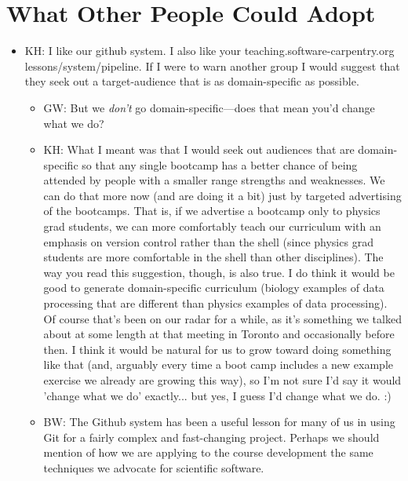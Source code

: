 \documentclass{article}
\begin{document}
\section{What Other People Could Adopt}

\begin{itemize}

  \item KH: I like our github system. I also like your
    teaching.software-carpentry.org lessons/system/pipeline. If I were
    to warn another group I would suggest that they seek out a
    target-audience that is as domain-specific as possible.

    \begin{itemize}

      \item GW: But we \emph{don't} go domain-specific---does that
        mean you'd change what we do?

      \item KH: What I meant was that I would seek out audiences that
        are domain-specific so that any single bootcamp has a better
        chance of being attended by people with a smaller range
        strengths and weaknesses. We can do that more now (and are
        doing it a bit) just by targeted advertising of the
        bootcamps. That is, if we advertise a bootcamp only to physics
        grad students, we can more comfortably teach our curriculum
        with an emphasis on version control rather than the shell
        (since physics grad students are more comfortable in the shell
        than other disciplines). The way you read this suggestion,
        though, is also true. I do think it would be good to generate
        domain-specific curriculum (biology examples of data
        processing that are different than physics examples of data
        processing). Of course that's been on our radar for a while,
        as it's something we talked about at some length at that
        meeting in Toronto and occasionally before then. I think it
        would be natural for us to grow toward doing something like
        that (and, arguably every time a boot camp includes a new
        example exercise we already are growing this way), so I'm not
        sure I'd say it would 'change what we do' exactly... but yes,
        I guess I'd change what we do. :)

      \item BW: The Github system has been a useful lesson for many of
	us in using Git for a fairly complex and fast-changing project.
	Perhaps we should mention of how we are applying to the course development
	the same techniques we advocate for scientific software.


\end{itemize}
\end{itemize}
\end{document}
